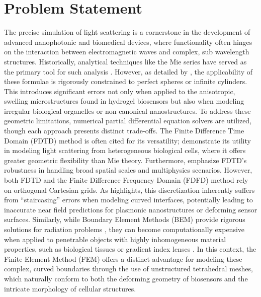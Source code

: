\documentclass[class=report, crop=false]{standalone}
\begin{document}
\section{Problem Statement}

The precise simulation of light scattering is a cornerstone in the development of advanced nanophotonic and biomedical devices, where functionality often hinges on the interaction between electromagnetic waves and complex, sub wavelength structures. Historically, analytical techniques like the Mie series have served as the primary tool for such analysis \citep{Wriedt2012}. However, as detailed by \citet{Martin1993}, the applicability of these formulae is rigorously constrained to perfect spheres or infinite cylinders. This introduces significant errors not only when applied to the anisotropic, swelling microstructures found in hydrogel biosensors but also when modeling irregular biological organelles or non-canonical nanostructures. To address these geometric limitations, numerical partial differential equation solvers are utilized, though each approach presents distinct trade-offs. The Finite Difference Time Domain (FDTD) method is often cited for its versatility; \citet{Drezek2000} demonstrate its utility in modeling light scattering from heterogeneous biological cells, where it offers greater geometric flexibility than Mie theory. Furthermore, \citet{teixeira2023finite} emphasize FDTD's robustness in handling broad spatial scales and multiphysics scenarios. However, both FDTD and the Finite Difference Frequency Domain (FDFD) method rely on orthogonal Cartesian grids. As \citet{Shin2013} highlights, this discretization inherently suffers from ``staircasing'' errors when modeling curved interfaces, potentially leading to inaccurate near field predictions for plasmonic nanostructures or deforming sensor surfaces. Similarly, while Boundary Element Methods (BEM) provide rigorous solutions for radiation problems \citep{Cools2011}, they can become computationally expensive when applied to penetrable objects with highly inhomogeneous material properties, such as biological tissues or gradient index lenses \citep{Buffa2003}. In this context, the Finite Element Method (FEM) offers a distinct advantage for modeling these complex, curved boundaries through the use of unstructured tetrahedral meshes, which naturally conform to both the deforming geometry of biosensors and the intricate morphology of cellular structures.

\vspace{12pt}
\end{document}
